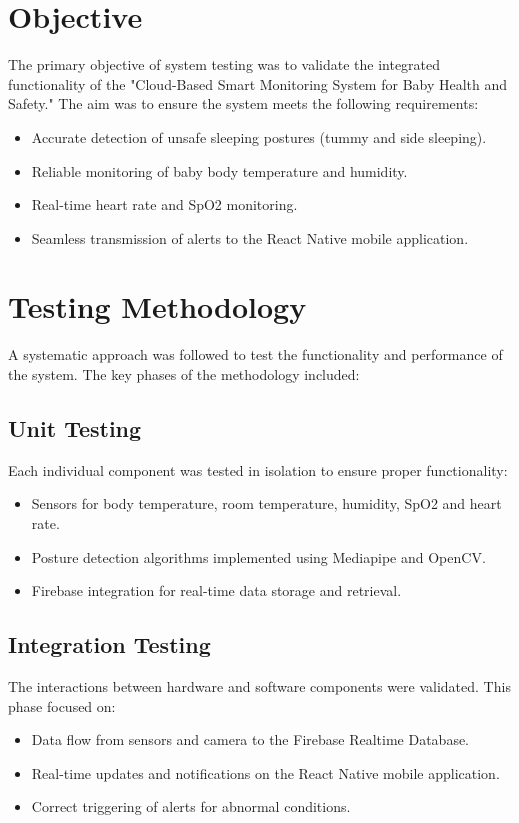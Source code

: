\documentclass[12pt,a4paper]{report}
\begin{document}
\section{Objective}
The primary objective of system testing was to validate the integrated functionality of the "Cloud-Based Smart Monitoring System for Baby Health and Safety." The aim was to ensure the system meets the following requirements:

\begin{itemize}
    \item Accurate detection of unsafe sleeping postures (tummy and side sleeping).
    \item Reliable monitoring of baby body temperature and humidity.
    \item Real-time heart rate and SpO2 monitoring.
    \item Seamless transmission of alerts to the React Native mobile application.
\end{itemize}

\section{Testing Methodology}
A systematic approach was followed to test the functionality and performance of the system. The key phases of the methodology included:

\subsection{Unit Testing}
Each individual component was tested in isolation to ensure proper functionality:
\begin{itemize}
    \item Sensors for body temperature, room temperature, humidity, SpO2 and heart rate.
    \item Posture detection algorithms implemented using Mediapipe and OpenCV.
    \item Firebase integration for real-time data storage and retrieval.
\end{itemize}

\subsection{Integration Testing}
The interactions between hardware and software components were validated. This phase focused on:
\begin{itemize}
    \item Data flow from sensors and camera to the Firebase Realtime Database.
    \item Real-time updates and notifications on the React Native mobile application.
    \item Correct triggering of alerts for abnormal conditions.
\end{itemize}
\end{document}
